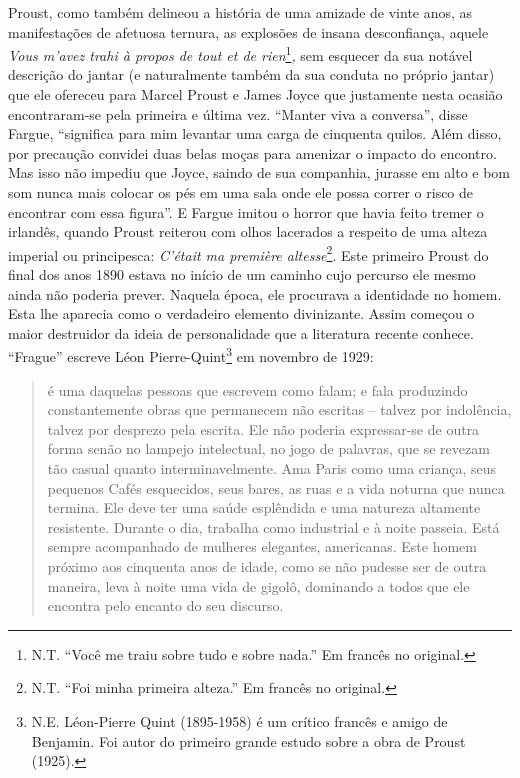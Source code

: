 Proust, como também delineou a história de uma amizade de vinte anos, as
manifestações de afetuosa ternura, as explosões de insana desconfiança,
aquele \emph{Vous m'avez trahi à propos de tout et de rien}\footnote{N.T.
  ``Você me traiu sobre tudo e sobre nada.'' Em francês no original.}\emph{,}
sem esquecer da sua notável descrição do jantar (e naturalmente também
da sua conduta no próprio jantar) que ele ofereceu para Marcel Proust e
James Joyce que justamente nesta ocasião encontraram-se pela primeira e
última vez. ``Manter viva a conversa'', disse Fargue, ``significa para
mim levantar uma carga de cinquenta quilos. Além disso, por precaução
convidei duas belas moças para amenizar o impacto do encontro. Mas isso
não impediu que Joyce, saindo de sua companhia, jurasse em alto e bom
som nunca mais colocar os pés em uma sala onde ele possa correr o risco
de encontrar com essa figura''. E Fargue imitou o horror que havia feito
tremer o irlandês, quando Proust reiterou com olhos lacerados a respeito
de uma alteza imperial ou principesca: \emph{C'était ma première
altesse}\footnote{N.T. ``Foi minha primeira alteza.'' Em francês no
  original.}. Este primeiro Proust do final dos anos 1890 estava no
início de um caminho cujo percurso ele mesmo ainda não poderia prever.
Naquela época, ele procurava a identidade no homem. Esta lhe aparecia
como o verdadeiro elemento divinizante. Assim começou o maior destruidor
da ideia de personalidade que a literatura recente conhece. ``Frague''
escreve Léon Pierre-Quint\footnote{N.E. Léon-Pierre Quint (1895-1958) é
  um crítico francês e amigo de Benjamin. Foi autor do primeiro grande
  estudo sobre a obra de Proust (1925).} em novembro de 1929:

\begin{quote}
é uma daquelas pessoas que escrevem como falam; e fala produzindo
constantemente obras que permanecem não escritas -- talvez por
indolência, talvez por desprezo pela escrita. Ele não poderia
expressar-se de outra forma senão no lampejo intelectual, no jogo de
palavras, que se revezam tão casual quanto interminavelmente. Ama Paris
como uma criança, seus pequenos Cafés esquecidos, seus bares, as ruas e
a vida noturna que nunca termina. Ele deve ter uma saúde esplêndida e
uma natureza altamente resistente. Durante o dia, trabalha como
industrial e à noite passeia. Está sempre acompanhado de mulheres
elegantes, americanas. Este homem próximo aos cinquenta anos de idade,
como se não pudesse ser de outra maneira, leva à noite uma vida de
gigolô, dominando a todos que ele encontra pelo encanto do seu discurso.
\end{quote}

